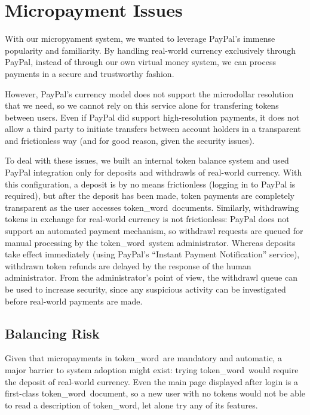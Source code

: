 \documentclass{acm_proc_article-sp}
\newcommand{\tw}{token\_word}
\begin{document}


\section{Micropayment Issues}
With our micropyament system, we wanted to leverage PayPal's \cite{paypal} immense popularity and familiarity.
By handling real-world currency exclusively through PayPal, instead of through our own virtual money system, we can process payments in a secure and trustworthy fashion.

However, PayPal's currency model does not support the microdollar resolution that we need, so we cannot rely on this service alone for transfering tokens between users.
Even if PayPal did support high-resolution payments, it does not allow a third party to initiate transfers between account holders in a transparent and frictionless way (and for good reason, given the security issues).

To deal with these issues, we built an internal token balance system and used PayPal integration only for deposits and withdrawls of real-world currency.
With this configuration, a deposit is by no means frictionless (logging in to PayPal is required), but after the deposit has been made, token payments are completely transparent as the user accesses \tw \  documents.
Similarly, withdrawing tokens in exchange for real-world currency is not frictionless: 
PayPal does not support an automated payment mechanism, so withdrawl requests are queued for manual processing by the \tw \  system administrator.
Whereas deposits take effect immediately (using PayPal's ``Instant Payment Notification'' service), withdrawn token refunds are delayed by the response of the human administrator.
From the administrator's point of view, the withdrawl queue can be used to increase security, since any suspicious activity can be investigated before real-world payments are made.  

\subsection{Balancing Risk}
Given that micropayments in \tw \  are mandatory and automatic, a major barrier to system adoption might exist:  trying \tw \  would require the deposit of real-world currency.
Even the main page displayed after login is a first-class \tw \  document, so a new user with no tokens would not be able to read a description of \tw, let alone try any of its features.
\end{document}
